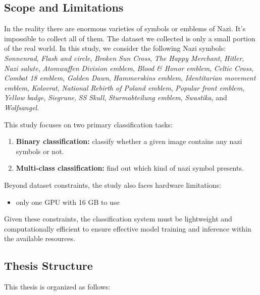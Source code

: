 \documentclass[11pt,a4paper,onecolumn]{article}
\begin{document}
\subsection{Scope and Limitations}

In the reality there are enormous varieties of symbols or emblems of Nazi. It's impossible to
collect all of them. The dataset we collected is only a small portion of the real world. In
this study, we consider the following Nazi symbols: \textit{Sonnenrad}, \textit{Flash and circle},
\textit{Broken Sun Cross}, \textit{The Happy Merchant}, \textit{Hitler}, \textit{Nazi salute},
\textit{Atomwaffen Division emblem}, \textit{Blood \& Honor emblem}, \textit{Celtic Cross},
\textit{Combat 18 emblem}, \textit{Golden Dawn}, \textit{Hammerskins emblem}, \textit{Identitarian movement emblem},
\textit{Kolovrat}, \textit{National Rebirth of Poland emblem}, \textit{Popular front emblem},
\textit{Yellow badge}, \textit{Siegrune}, \textit{SS Skull},
\textit{Sturmabteilung emblem}, \textit{Swastika}, and \textit{Wolfsangel}.

This study focuses on two primary classification tasks:
\begin{enumerate}
  \item \textbf{Binary classification:} classify whether a given image contains any nazi symbols or not.
  \item \textbf{Multi-class classification:} find out which kind of nazi
    symbol presents.
\end{enumerate}

Beyond dataset constraints, the study also faces hardware limitations:

\begin{itemize}
  \item only one GPU with 16 GB to use
\end{itemize}

Given these constraints, the classification system must be
lightweight and computationally efficient to ensure effective model
training and inference within the available resources.

\subsection{Thesis Structure}

This thesis is organized as follows:
\end{document}
